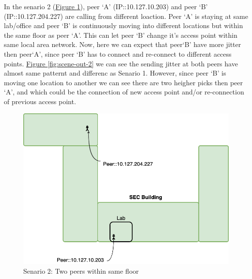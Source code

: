 	In the senario 2 (\hyperref[fig:scene-2]{Figure \ref{fig:scene-2}}), peer `A' (IP::10.127.10.203) and peer `B' (IP::10.127.204.227) are calling from different loaction. Peer `A' is staying at same lab/office and peer `B' is continuously moving into different locations but within the same floor as peer `A'. This can let peer `B' change it's access point within same local area network. Now, here we can expect that peer`B' have more jitter then peer`A', since peer `B' has to connect and re-connect to different access points. \hyperref[fig:scene-out-2]{Figure \ref{fig:scene-out-2}} we can see the sending jitter at both peers have almost same patternt and differenc as Senario 1. However, since peer `B' is moving one location to another we can see there are two heigher picks then peer `A', and which could be the connection of new access point and/or re-connection of previous access point.
	\begin{figure}[thb]
		\begin{minipage}{\textwidth}
			\includegraphics[scale=0.29]{Images/experiment/senarios/in_floor.drawio.png}
		\end{minipage}
		\caption{Senario 2: Two peers within same floor}
		\label{fig:scene-2}
	\end{figure}

